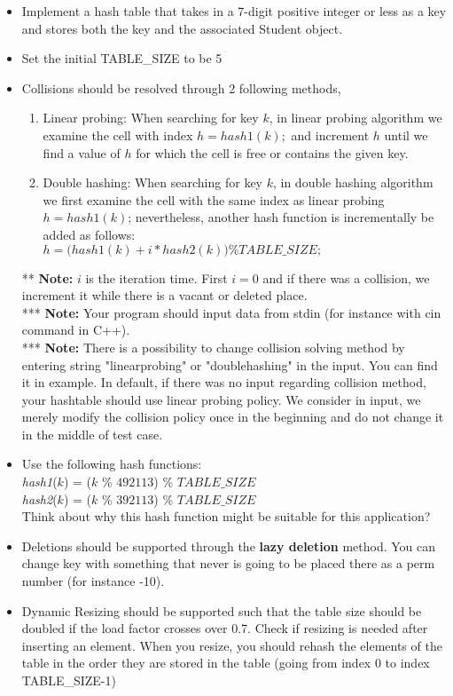 \documentclass[times, 12pt]{article}
\begin{document}
\begin{itemize}
    \item Implement a hash table that takes in a 7-digit positive integer or less as a key and stores both the key and the associated Student object.
    
    \item Set the initial TABLE\_SIZE to be 5
    
    \item Collisions should be resolved through 2 following methods,
    \begin{enumerate}
        \item Linear probing: When searching for key $k$, in linear probing algorithm we examine the cell with index $h = hash1(k);$ and increment $h$ until we find a value of $h$ for which the cell is free or contains the given key.
        \item Double hashing: When searching for key $k$, in double hashing algorithm we first examine the cell with the same index as linear probing $h = hash1(k)$; nevertheless, another hash function is incrementally be added as follows:\\
        $h = \Big(hash1(k) + i * hash2(k)\Big) \%TABLE\_SIZE;$
    \end{enumerate}
    ** \textbf{Note: }$i$ is the iteration time. First $i=0$ and if there was a collision, we increment it while there is a vacant or deleted place.\\
    *** \textbf{Note: }Your program should input data from stdin (for instance with cin command in C++).\\
    *** \textbf{Note: }There is a possibility to change collision solving method by entering string "linearprobing" or "doublehashing" in the input. You can find it in example. In default, if there was no input regarding collision method, your hashtable should use linear probing policy. We consider in input, we merely modify the collision policy once in the beginning and do not change it in the middle of test case.

    \item Use the following hash functions:\\ \textit{hash1}($k$) = ($k$ \% $492113$) \% $TABLE\_SIZE$\\ \textit{hash2}($k$) = ($k$ \% $392113$) \% $TABLE\_SIZE$\\
    Think about why this hash function might be suitable for this application?

    \item Deletions should be supported through the \textbf{lazy deletion} method. You can change key with something that never is going to be placed there as a perm number (for instance -10).
    
    \item Dynamic Resizing should be supported such that the table size should be doubled if the load factor crosses over 0.7. Check if resizing is needed after inserting an element. When you resize, you should rehash the elements of the table in the order they are stored in the table (going from index 0 to index TABLE\_SIZE-1)
\end{itemize}
\end{document}
